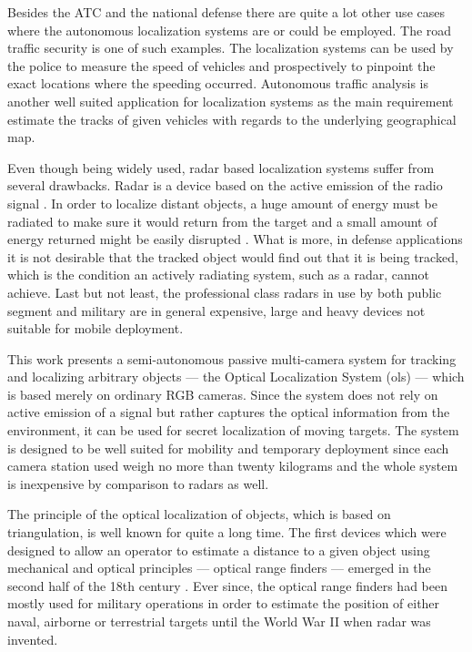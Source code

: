 Besides the ATC and the national defense there are quite a lot other use cases where the autonomous localization systems are or could be employed. The road traffic security is one of such examples. The localization systems can be used by the police to measure the speed of vehicles and prospectively to pinpoint the exact locations where the speeding occurred. Autonomous traffic analysis is another well suited application for localization systems as the main requirement estimate the tracks of given vehicles with regards to the underlying geographical map.

Even though being widely used, radar based localization systems suffer from several drawbacks. Radar is a device based on the active emission of the radio signal \cite{toomay2012radar}. In order to localize distant objects, a huge amount of energy must be radiated to make sure it would return from the target and a small amount of energy returned might be easily disrupted \cite{Airtrafficmuseum}. What is more, in defense applications it is not desirable that the tracked object would find out that it is being tracked, which is the condition an actively radiating system, such as a radar, cannot achieve. Last but not least, the professional class radars in use by both public segment and military are in general expensive, large and heavy devices not suitable for mobile deployment.

This work presents a semi-autonomous passive multi-camera system for tracking and localizing arbitrary objects --- the Optical Localization System (\gls{ols}) --- which is based merely on ordinary RGB cameras. Since the system does not rely on active emission of a signal but rather captures the optical information from the environment, it can be used for secret localization of moving targets. The system is designed to be well suited for mobility and temporary deployment since each camera station used weigh no more than twenty kilograms and the whole system is inexpensive by comparison to radars as well.

The principle of the optical localization of objects, which is based on triangulation, is well known for quite a long time. The first devices which were designed to allow an operator to estimate a distance to a given object using mechanical and optical principles --- optical range finders --- emerged in the second half of the 18th century \cite{bud1998instruments}. Ever since, the optical range finders had been mostly used for military operations in order to estimate the position of either naval, airborne or terrestrial targets until the World War II when radar was invented.

